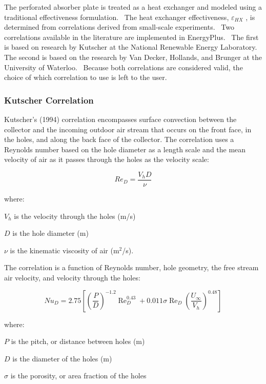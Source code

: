 The perforated absorber plate is treated as a heat exchanger and modeled using a traditional effectiveness formulation.~ The heat exchanger effectiveness, \({\varepsilon_{HX}}\) , is determined from correlations derived from small-scale experiments.~ Two correlations available in the literature are implemented in EnergyPlus.~ The first is based on research by Kutscher at the National Renewable Energy Laboratory. The second is based on the research by Van Decker, Hollands, and Brunger at the University of Waterloo.~ Because both correlations are considered valid, the choice of which correlation to use is left to the user.

\subsubsection{Kutscher Correlation}\label{kutscher-correlation}

Kutscher's (1994) correlation encompasses surface convection between the collector and the incoming outdoor air stream that occurs on the front face, in the holes, and along the back face of the collector. The correlation uses a Reynolds number based on the hole diameter as a length scale and the mean velocity of air as it passes through the holes as the velocity scale:

\begin{equation}
{Re_D} = \frac{{{V_h}D}}{\nu }
\end{equation}

where:

\({V_h}\) is the velocity through the holes (m/s)

\(D\) is the hole diameter (m)

\(\nu\) is the kinematic viscosity of air (m\(^{2}\)/s).

The correlation is a function of Reynolds number, hole geometry, the free stream air velocity, and velocity through the holes:

\begin{equation}
N{u_D} = 2.75\left[ {{{\left( {\frac{P}{D}} \right)}^{ - 1.2}}\operatorname{Re}_D^{0.43} + 0.011\sigma {{\operatorname{Re} }_D}{{\left( {\frac{{{U_\infty }}}{{{V_h}}}} \right)}^{0.48}}} \right]
\end{equation}

where:

\(P\) is the pitch, or distance between holes (m)

\(D\) is the diameter of the holes (m)

\(\sigma\) is the porosity, or area fraction of the holes

